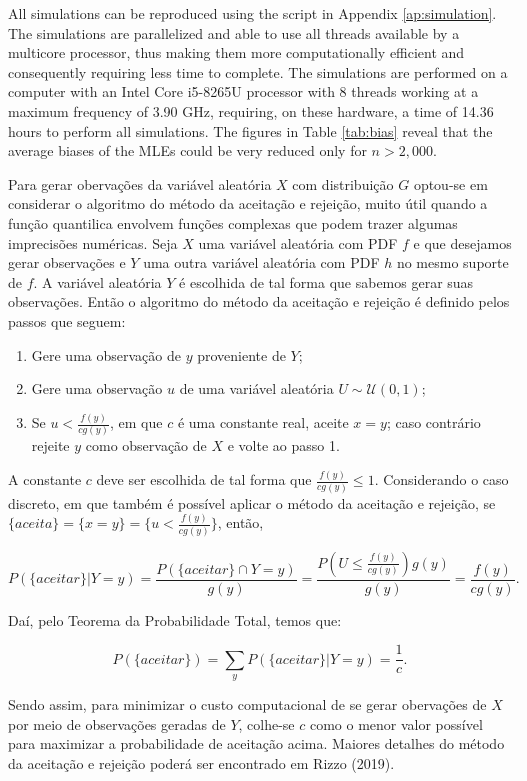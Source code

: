 \documentclass[12pt,a4paper]{article} %
\begin{document}
All simulations can be reproduced using the script in Appendix \ref{ap:simulation}. The simulations are parallelized and able to use all threads
available by a multicore processor, thus making them more computationally efficient and consequently requiring less time to complete.
The simulations are performed on a computer with an Intel Core i5-8265U processor with 8 threads working at a maximum frequency of 3.90 GHz,
requiring, on these hardware, a time of 14.36 hours to perform all simulations. The figures in Table \ref{tab:bias} reveal that the average
biases of the MLEs could be very reduced only for $n> 2,000$.

{\color{red}

Para gerar obervações da variável aleatória $X$ com distribuição $G$ optou-se em considerar  o algoritmo do método da aceitação e rejeição, muito útil quando a função quantilica envolvem funções complexas que podem trazer algumas imprecisões numéricas.  Seja $X$ uma variável aleatória com PDF  $f$ e que desejamos gerar observações e $Y$  uma outra variável aleatória com PDF $h$ no mesmo suporte de $f$. A variável aleatória $Y$ é escolhida de tal forma que sabemos gerar suas observações. Então o algoritmo do método da aceitação e rejeição é definido pelos passos que seguem:

\begin{enumerate}
	\item Gere uma observação de $y$ proveniente de $Y$;
	\item Gere uma observação $u$ de uma variável aleatória $U\sim \mathcal{U}(0, 1)$;
	\item Se $u < \frac{f(y)}{cg(y)}$,  em que $c$ é uma constante real, aceite $x = y$; caso contrário rejeite $y$ como observação de $X$ e volte ao passo 1.
\end{enumerate}
A constante $c$ deve ser escolhida de tal forma que $\frac{f(y)}{cg(y)} \leq 1$. Considerando o caso discreto, em que também é possível aplicar o método da aceitação e rejeição, se $\{aceita\} = \{x = y\} = \{u < \frac{f(y)}{cg(y)}\}$, então,

$$P(\{aceitar\}| Y = y) = \frac{P(\{aceitar\} \cap {Y=y})}{g(y)} = \frac{P\left( U \leq  \frac{f(y)}{cg(y)}\right)g(y)}{g(y)} = \frac{f(y)}{cg(y)}.$$

Daí, pelo Teorema da Probabilidade Total, temos que:

$$P(\{aceitar\}) = \sum_y P(\{aceitar\}| Y  = y) = \frac{1}{c}.$$

Sendo assim, para minimizar o custo computacional de se gerar obervações de $X$ por meio de observações geradas de $Y$, colhe-se $c$ como o menor valor possível para maximizar a probabilidade de aceitação acima. Maiores detalhes do método da aceitação e rejeição poderá ser encontrado em Rizzo (2019).
}
\end{document}
